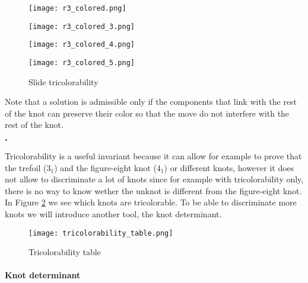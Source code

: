 \documentclass[12pt, a4paper]{article}
\newenvironment{proof}{{\sc Proof:}}{\hfill $\square$}
\begin{document}
\begin{proof}
\begin{itemize}
\begin{figure}[H]
\begin{minipage}[c]{.3\textwidth}
  \end{minipage}
  \begin{minipage}[c]{.3\textwidth}
             \centering
            \texttt{[image: r3\_colored.png]}
    
  \end{minipage}
  \begin{minipage}[c]{.3\textwidth}
             \centering
            \texttt{[image: r3\_colored\_3.png]}
    
  \end{minipage}
  \begin{minipage}[c]{.5\textwidth}
             \centering
            \texttt{[image: r3\_colored\_4.png]}
    
  \end{minipage}
  \begin{minipage}[c]{.5\textwidth}
             \centering
            \texttt{[image: r3\_colored\_5.png]}
    
  \end{minipage}
          \caption{Slide tricolorability}
        \label{fig:r_3_colored}
\end{figure}
\end{itemize}

Note that a solution is admissible only if the components that link with the rest of the knot can preserve their color so that the move do not interfere with the rest of the knot.

\end{proof}

Tricolorability is a useful invariant because it can allow for example to prove that the trefoil ($3_1$) and the figure-eight knot ($4_1$) or different knots, however it does not allow to discriminate a lot of knots since for example with tricolorability only, there is no way to know wether the unknot is different from the figure-eight knot. In Figure \ref{fig:tricolor_table} we see which knots are tricolorable. To be able to discriminate more knots we will introduce another tool, the knot determinant. 

\begin{figure}[H]
  \centering
  \texttt{[image: tricolorability\_table.png]}
  \caption{Tricolorability table}
  \label{fig:tricolor_table}
\end{figure}

\paragraph{Knot determinant}
\label{sec:knot_det}
\end{document}
